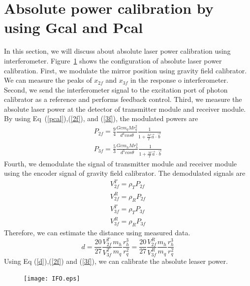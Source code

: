 \documentclass[12pt]{iopart}
\begin{document}
\section{Absolute power calibration by using Gcal and Pcal}
In this section, we will discuss about absolute laser power calibration using interferometer. 
Figure~\ref{fig:IFO} shows the configuration of absolute laser power calibration.
First, we modulate the mirror position using gravity field calibrator. We can measure the peaks of $x_{2f}$ and $x_{3f}$ in the response o interferometer. Second, we send the interferometer signal to the excitation port of photon calibrator as a reference and performs feedback control. Third, we measure the absolute laser power at the detector of transmitter module and receiver module. By using Eq~(\ref{pcal}),(\ref{2f}), and (\ref{3f}), the modulated powers are
\begin{eqnarray}
 P_{2f}=\frac{9}{4} \frac{Gcm_{q}Mr_{q}^2}{d^4cos\theta}\frac{1}{1+\frac{M}{I}\vec{a}\cdot \vec{b}} \label{2f} \\
 P_{3f}= \frac{5}{3} \frac{Gcm_{h}Mr_{h}^3}{d^5cos\theta}\frac{1}{1+\frac{M}{I}\vec{a}\cdot \vec{b}} \label{3f}
\end{eqnarray}
Fourth, we demodulate the signal of transmitter module and receiver module using the encoder signal of gravity field calibrator.
The demodulated signals are 
\begin{eqnarray}
V_{2f}^{T}=\rho_{T}P_{2f} \\
V_{2f}^{R}=\rho_{R}P_{2f} \\
V_{3f}^{T}=\rho_{T}P_{3f} \\
V_{3f}^{R}=\rho_{R}P_{3f} 
\end{eqnarray} 
Therefore, we can estimate the distance using measured data. 
\begin{equation}
d=\frac{20}{27} \frac{V_{2f}^T}{V_{3f}^T}\frac{m_{h}}{m_{q}}\frac{r_{h}^{3}}{r_{q}^{2}}=\frac{20}{27} \frac{V_{2f}^R}{V_{3f}^R}\frac{m_{h}}{m_{q}}\frac{r_{h}^{3}}{r_{q}^{2}} \label{d}
\end{equation}
Using Eq (\ref{d}),(\ref{2f}) and (\ref{3f}), we can calibrate the absolute leaser power.

\begin{figure}
\begin{center}
\texttt{[image: IFO.eps]}
\caption{}
\label{fig:IFO}
\end{center}
\end{figure}
\end{document}
